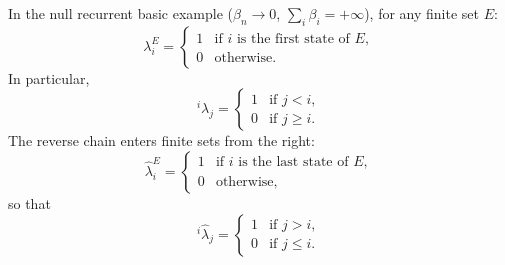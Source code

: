 In the null recurrent basic example ($\beta_n \to 0$, $\sum_i \beta_i = +\infty$), for any finite set $E$:
$$\lambda_i^E = \begin{cases} 1 & \text{if } i \text{ is the first state of } E, \\ 0 & \text{otherwise}. \end{cases}$$
In particular,
$$^i\lambda_j = \begin{cases} 1 & \text{if } j < i, \\ 0 & \text{if } j \geq i. \end{cases}$$
The reverse chain enters finite sets from the right:
$$\hat{\lambda}_i^E = \begin{cases} 1 & \text{if } i \text{ is the last state of } E, \\ 0 & \text{otherwise}, \end{cases}$$
so that
$$^i\hat{\lambda}_j = \begin{cases} 1 & \text{if } j > i, \\ 0 & \text{if } j \leq i. \end{cases}$$
